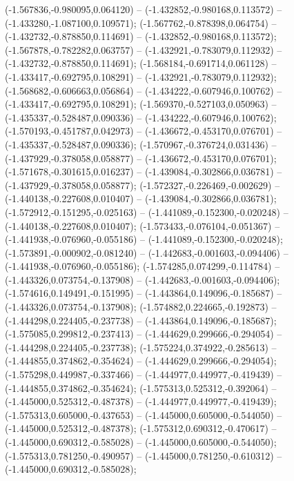  (-1.567836,-0.980095,0.064120) -- (-1.432852,-0.980168,0.113572) -- (-1.433280,-1.087100,0.109571);
 (-1.567762,-0.878398,0.064754) -- (-1.432732,-0.878850,0.114691) -- (-1.432852,-0.980168,0.113572);
 (-1.567878,-0.782282,0.063757) -- (-1.432921,-0.783079,0.112932) -- (-1.432732,-0.878850,0.114691);
 (-1.568184,-0.691714,0.061128) -- (-1.433417,-0.692795,0.108291) -- (-1.432921,-0.783079,0.112932);
 (-1.568682,-0.606663,0.056864) -- (-1.434222,-0.607946,0.100762) -- (-1.433417,-0.692795,0.108291);
 (-1.569370,-0.527103,0.050963) -- (-1.435337,-0.528487,0.090336) -- (-1.434222,-0.607946,0.100762);
 (-1.570193,-0.451787,0.042973) -- (-1.436672,-0.453170,0.076701) -- (-1.435337,-0.528487,0.090336);
 (-1.570967,-0.376724,0.031436) -- (-1.437929,-0.378058,0.058877) -- (-1.436672,-0.453170,0.076701);
 (-1.571678,-0.301615,0.016237) -- (-1.439084,-0.302866,0.036781) -- (-1.437929,-0.378058,0.058877);
 (-1.572327,-0.226469,-0.002629) -- (-1.440138,-0.227608,0.010407) -- (-1.439084,-0.302866,0.036781);
 (-1.572912,-0.151295,-0.025163) -- (-1.441089,-0.152300,-0.020248) -- (-1.440138,-0.227608,0.010407);
 (-1.573433,-0.076104,-0.051367) -- (-1.441938,-0.076960,-0.055186) -- (-1.441089,-0.152300,-0.020248);
 (-1.573891,-0.000902,-0.081240) -- (-1.442683,-0.001603,-0.094406) -- (-1.441938,-0.076960,-0.055186);
 (-1.574285,0.074299,-0.114784) -- (-1.443326,0.073754,-0.137908) -- (-1.442683,-0.001603,-0.094406);
 (-1.574616,0.149491,-0.151995) -- (-1.443864,0.149096,-0.185687) -- (-1.443326,0.073754,-0.137908);
 (-1.574882,0.224665,-0.192873) -- (-1.444298,0.224405,-0.237738) -- (-1.443864,0.149096,-0.185687);
 (-1.575085,0.299812,-0.237413) -- (-1.444629,0.299666,-0.294054) -- (-1.444298,0.224405,-0.237738);
 (-1.575224,0.374922,-0.285613) -- (-1.444855,0.374862,-0.354624) -- (-1.444629,0.299666,-0.294054);
 (-1.575298,0.449987,-0.337466) -- (-1.444977,0.449977,-0.419439) -- (-1.444855,0.374862,-0.354624);
 (-1.575313,0.525312,-0.392064) -- (-1.445000,0.525312,-0.487378) -- (-1.444977,0.449977,-0.419439);
 (-1.575313,0.605000,-0.437653) -- (-1.445000,0.605000,-0.544050) -- (-1.445000,0.525312,-0.487378);
 (-1.575312,0.690312,-0.470617) -- (-1.445000,0.690312,-0.585028) -- (-1.445000,0.605000,-0.544050);
 (-1.575313,0.781250,-0.490957) -- (-1.445000,0.781250,-0.610312) -- (-1.445000,0.690312,-0.585028);
